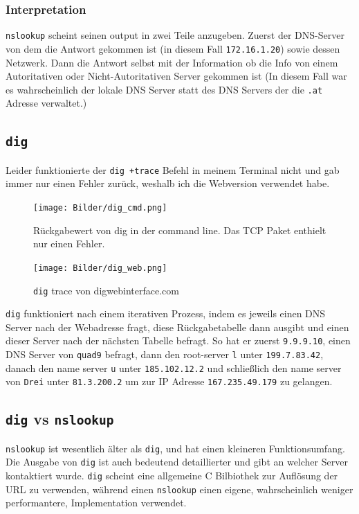 \documentclass{article}
\begin{document}
	\subsubsection{Interpretation}
	\verb|nslookup| scheint seinen output in zwei Teile anzugeben. Zuerst der DNS-Server von dem die Antwort gekommen ist (in diesem Fall \verb|172.16.1.20|) sowie dessen Netzwerk. Dann die Antwort selbst mit der Information ob die Info von einem Autoritativen oder Nicht-Autoritativen Server gekommen ist (In diesem Fall war es wahrscheinlich der lokale DNS Server statt des DNS Servers der die \verb|.at| Adresse verwaltet.) 
	\cprotect\subsection{\verb|dig|}
	Leider funktionierte der \verb|dig +trace| Befehl in meinem Terminal nicht und gab immer nur einen Fehler zurück, weshalb ich die Webversion verwendet habe.
	\begin{figure}[H]
	\centering
	\texttt{[image: Bilder/dig\_cmd.png]}
	\caption{Rückgabewert von dig in der command line. Das TCP Paket enthielt nur einen Fehler.}
	\end{figure}
	\begin{figure}[H]
	\centering
	\texttt{[image: Bilder/dig\_web.png]}
	\cprotect\caption{\verb|dig| trace von digwebinterface.com}
	\end{figure}
	\verb|dig| funktioniert nach einem iterativen Prozess, indem es jeweils einen DNS Server nach der Webadresse fragt, diese Rückgabetabelle dann ausgibt und einen dieser Server nach der nächsten Tabelle befragt. So hat er zuerst \verb|9.9.9.10|, einen DNS Server von \verb|quad9|  befragt, dann den root-server \verb|l| unter \verb|199.7.83.42|, danach den name server \verb|u| unter \verb|185.102.12.2| und schließlich den name server von \verb|Drei| unter \verb|81.3.200.2| um zur IP Adresse \verb|167.235.49.179| zu gelangen.
	\cprotect\subsection{\verb|dig| vs \verb|nslookup|}     	
	\verb|nslookup| ist wesentlich älter als \verb|dig|, und hat einen kleineren Funktionsumfang. Die Ausgabe von \verb|dig| ist auch bedeutend detaillierter und gibt an welcher Server kontaktiert wurde. \verb|dig| scheint eine allgemeine C Bilbiothek zur Auflösung der URL zu verwenden, während einen \verb|nslookup| einen eigene, wahrscheinlich weniger performantere, Implementation verwendet.

	
	
	
	
\end{document}
